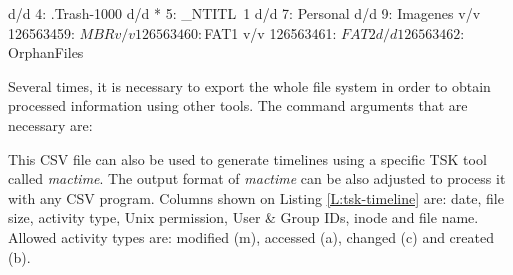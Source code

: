 \begin{terminal}[caption=TSK fls output example,label=L:fls-output-example]
%
%
d/d 4:	.Trash-1000
d/d * 5:	_NTITL~1
d/d 7:	Personal
d/d 9:	Imagenes
v/v 126563459:	$MBR
v/v 126563460:	$FAT1
v/v 126563461:	$FAT2
d/d 126563462:	$OrphanFiles
\end{terminal}

Several times, it is necessary to export the whole file system in order to obtain
processed information using other tools. The command arguments that are
necessary are:

\begin{terminal}[caption=Export file system to CSV,label=L:fls-csv-export]
%
%

\end{terminal}

This CSV file can also be used to generate timelines using a specific TSK tool 
called \textit{mactime}. The output format of \textit{mactime} can be also
adjusted to process it with any CSV program. Columns shown on Listing
\ref{L:tsk-timeline} are: date, file size, activity type, Unix permission, User
\& Group IDs, inode and file name. Allowed activity types are: modified (m),
accessed (a), changed (c) and created (b).

